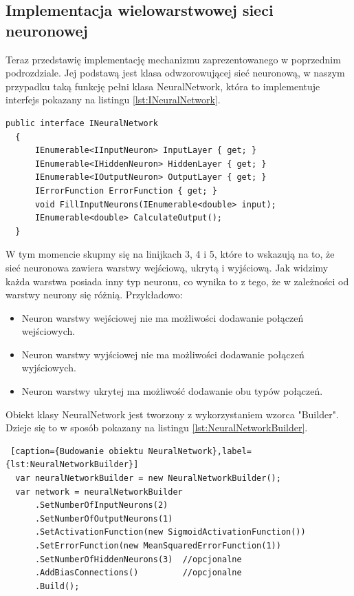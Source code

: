 \subsection{Implementacja wielowarstwowej sieci neuronowej}

Teraz przedstawię implementację mechanizmu zaprezentowanego w poprzednim podrozdziale.
Jej podstawą jest klasa odwzorowującej sieć neuronową, w naszym przypadku
taką funkcję pełni klasa NeuralNetwork, która to implementuje interfejs pokazany na listingu \ref{lst:INeuralNetwork}.

\begin{lstlisting}[caption={Interfejs INeuralNetwork}, label={lst:INeuralNetwork}]
  public interface INeuralNetwork
  {
      IEnumerable<IInputNeuron> InputLayer { get; }
      IEnumerable<IHiddenNeuron> HiddenLayer { get; }
      IEnumerable<IOutputNeuron> OutputLayer { get; }
      IErrorFunction ErrorFunction { get; }
      void FillInputNeurons(IEnumerable<double> input);
      IEnumerable<double> CalculateOutput();
  }
\end{lstlisting}

W tym momencie skupmy się na linijkach 3, 4 i 5, które to wskazują na to, że sieć neuronowa zawiera warstwy wejściową, ukrytą i wyjściową.
Jak widzimy każda warstwa posiada inny typ neuronu, co wynika to z tego, że w zależności od warstwy neurony się różnią. Przykładowo:
\begin{itemize}
  \item Neuron warstwy wejściowej nie ma możliwości dodawanie połączeń wejściowych.
  \item Neuron warstwy wyjściowej nie ma możliwości dodawanie połączeń wyjściowych.
  \item Neuron warstwy ukrytej ma możliwość dodawanie obu typów połączeń.
\end{itemize}

Obiekt klasy NeuralNetwork jest tworzony z wykorzystaniem wzorca "Builder".
Dzieje się to w sposób pokazany na listingu \ref{lst:NeuralNetworkBuilder}.

\begin{lstlisting} [caption={Budowanie obiektu NeuralNetwork},label={lst:NeuralNetworkBuilder}]
  var neuralNetworkBuilder = new NeuralNetworkBuilder();
  var network = neuralNetworkBuilder
      .SetNumberOfInputNeurons(2)
      .SetNumberOfOutputNeurons(1)
      .SetActivationFunction(new SigmoidActivationFunction())
      .SetErrorFunction(new MeanSquaredErrorFunction(1))
      .SetNumberOfHiddenNeurons(3)  //opcjonalne
      .AddBiasConnections()         //opcjonalne
      .Build();
\end{lstlisting}

